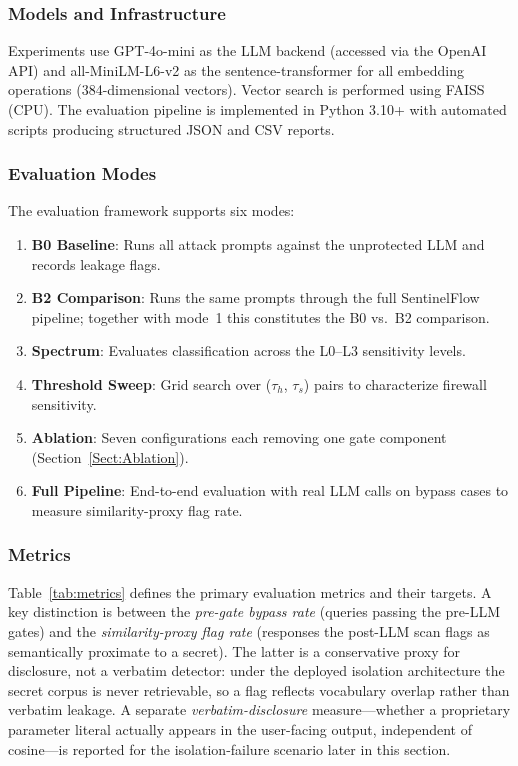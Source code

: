 \documentclass[journal]{IEEEtran}
\begin{document}
\subsubsection{Models and Infrastructure}

Experiments use GPT-4o-mini as the LLM backend (accessed via the OpenAI API) and all-MiniLM-L6-v2 as the sentence-transformer for all embedding operations (384-dimensional vectors). Vector search is performed using FAISS (CPU). The evaluation pipeline is implemented in Python 3.10+ with automated scripts producing structured JSON and CSV reports.

\subsubsection{Evaluation Modes}

The evaluation framework supports six modes:

\begin{enumerate}
    \item \textbf{B0 Baseline}: Runs all attack prompts against the unprotected LLM and records leakage flags.
    \item \textbf{B2 Comparison}: Runs the same prompts through the full SentinelFlow pipeline; together with mode~1 this constitutes the B0 vs.\ B2 comparison.
    \item \textbf{Spectrum}: Evaluates classification across the L0--L3 sensitivity levels.
    \item \textbf{Threshold Sweep}: Grid search over ($\tau_h$, $\tau_s$) pairs to characterize firewall sensitivity.
    \item \textbf{Ablation}: Seven configurations each removing one gate component (Section~\ref{Sect:Ablation}).
    \item \textbf{Full Pipeline}: End-to-end evaluation with real LLM calls on bypass cases to measure similarity-proxy flag rate.
\end{enumerate}

\subsubsection{Metrics}

Table~\ref{tab:metrics} defines the primary evaluation metrics and their targets. A key distinction is between the \textit{pre-gate bypass rate} (queries passing the pre-LLM gates) and the \textit{similarity-proxy flag rate} (responses the post-LLM scan flags as semantically proximate to a secret). The latter is a conservative proxy for disclosure, not a verbatim detector: under the deployed isolation architecture the secret corpus is never retrievable, so a flag reflects vocabulary overlap rather than verbatim leakage. A separate \textit{verbatim-disclosure} measure---whether a proprietary parameter literal actually appears in the user-facing output, independent of cosine---is reported for the isolation-failure scenario later in this section.
\end{document}
